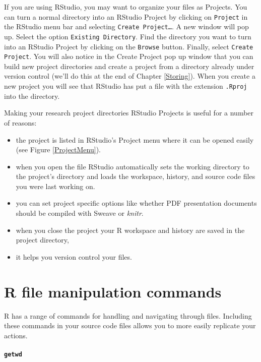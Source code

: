 If you are using RStudio, you may want to organize your files as Projects. You can turn a normal directory into an RStudio Project by clicking on \texttt{Project} in the RStudio menu bar and selecting \texttt{Create Project\ldots}. A new window will pop up. Select the option \texttt{Existing Directory}. Find the directory you want to turn into an RStudio Project by clicking on the \texttt{Browse} button. Finally, select \texttt{Create Project}. You will also notice in the Create Project pop up window that you can build new project directories and create a project from a directory already under version control (we'll do this at the end of Chapter \ref{Storing}). When you create a new project you will see that RStudio has put a file with the extension \texttt{.Rproj} into the directory.

Making your research project directories RStudio Projects is useful for a number of reasons:

\begin{itemize}
    \item the project is listed in RStudio's Project menu where it can be opened easily (see Figure \ref{ProjectMenu}).
    \item when you open the  file RStudio automatically sets the working directory to the project's directory and loads the workspace, history, and source code files you were last working on.
    \item you can set project specific options like whether PDF presentation documents should be compiled with Sweave or {\emph{knitr}}.
    \item when you close the project your R workspace and history are saved in the project directory,
    \item it helps you version control your files.
\end{itemize}

\section{R file manipulation commands}

R has a range of commands for handling and navigating through files. Including these commands in your source code files allows you to more easily replicate your actions.

\paragraph{{\tt{getwd}}}

